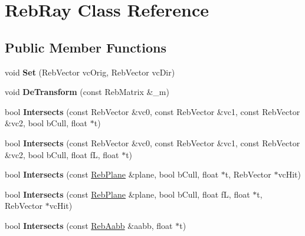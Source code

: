 \hypertarget{class_reb_ray}{}\section{Reb\+Ray Class Reference}
\label{class_reb_ray}
\subsection*{Public Member Functions}
\begin{DoxyCompactItemize}
\item 
void {\bfseries Set} (Reb\+Vector vc\+Orig, Reb\+Vector vc\+Dir)\hypertarget{class_reb_ray_abcaf5708ddc6850b918908c803148067}{}\label{class_reb_ray_abcaf5708ddc6850b918908c803148067}

\item 
void {\bfseries De\+Transform} (const Reb\+Matrix \&\+\_\+m)\hypertarget{class_reb_ray_a64a9f3740362eb8b758a053d1ff645ee}{}\label{class_reb_ray_a64a9f3740362eb8b758a053d1ff645ee}

\item 
bool {\bfseries Intersects} (const Reb\+Vector \&vc0, const Reb\+Vector \&vc1, const Reb\+Vector \&vc2, bool b\+Cull, float $\ast$t)\hypertarget{class_reb_ray_a5bf01f960842078027bef99476852817}{}\label{class_reb_ray_a5bf01f960842078027bef99476852817}

\item 
bool {\bfseries Intersects} (const Reb\+Vector \&vc0, const Reb\+Vector \&vc1, const Reb\+Vector \&vc2, bool b\+Cull, float fL, float $\ast$t)\hypertarget{class_reb_ray_a7a1084e88d5f041d0196e51cd61107b0}{}\label{class_reb_ray_a7a1084e88d5f041d0196e51cd61107b0}

\item 
bool {\bfseries Intersects} (const \hyperlink{class_reb_plane}{Reb\+Plane} \&plane, bool b\+Cull, float $\ast$t, Reb\+Vector $\ast$vc\+Hit)\hypertarget{class_reb_ray_a80e72bb9f7645432d4dd8ab1c50b56e8}{}\label{class_reb_ray_a80e72bb9f7645432d4dd8ab1c50b56e8}

\item 
bool {\bfseries Intersects} (const \hyperlink{class_reb_plane}{Reb\+Plane} \&plane, bool b\+Cull, float fL, float $\ast$t, Reb\+Vector $\ast$vc\+Hit)\hypertarget{class_reb_ray_a1fbb277e07c7fa90fcdbc6ad9c67a594}{}\label{class_reb_ray_a1fbb277e07c7fa90fcdbc6ad9c67a594}

\item 
bool {\bfseries Intersects} (const \hyperlink{class_reb_aabb}{Reb\+Aabb} \&aabb, float $\ast$t)\hypertarget{class_reb_ray_a7d1c5d54171abc9fbc64d834eb124415}{}\label{class_reb_ray_a7d1c5d54171abc9fbc64d834eb124415}


\end{DoxyCompactItemize}
